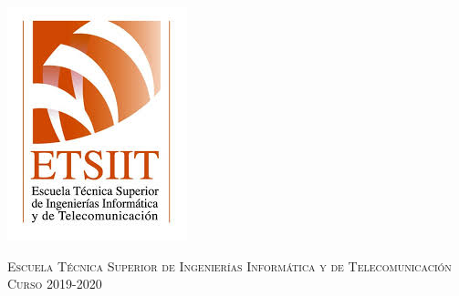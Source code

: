 \begin{titlepage}
\begin{minipage}{\textwidth}
        \includegraphics[scale=0.3]{img/etsiit.jpeg}

        \vspace{0.7cm}
        \textsc{Escuela Técnica Superior de Ingenierías Informática y de Telecomunicación}\\
        \vspace{1cm}
        \textsc{Curso 2019-2020}
    \end{minipage}
\end{titlepage}
